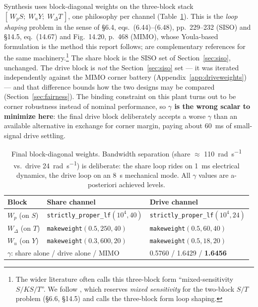 \documentclass[energies,article,submit,pdftex,oneauthor]{Definitions/mdpi}
\begin{document}
Synthesis uses block-diagonal weights on the three-block stack
$[\,W_p S;\; W_u Y;\; W_{\Delta} T\,]$, one philosophy per channel
(Table~\ref{tab:mimo-weights}). This is the \emph{loop shaping} problem in the sense of
\citep{assadian2020neoclassical} \S6.4, eqs.~(6.44)--(6.48), pp.~229--232 (SISO) and \S14.5,
eq.~(14.67) and Fig.~14.20, p.~468 (MIMO), whose Youla-based formulation is the method this
report follows; \citep{zhou1996robust,skogestad2005multivariable} are complementary
references for the same machinery.\footnote{The wider literature often calls this three-block
form ``mixed-sensitivity $S/KS/T$''. We follow \citep{assadian2020neoclassical}, which reserves
\emph{mixed sensitivity} for the two-block $S/T$ problem (\S6.6, \S14.5) and calls the
three-block form loop shaping.} The share block is the SISO set of Section~\ref{sec:siso},
unchanged. The drive block is \emph{not} the Section~\ref{sec:siso} set --- it was iterated
independently against the MIMO corner battery (Appendix~\ref{app:driveweights}) --- and that
difference bounds how the two designs may be compared (Section~\ref{sec:fairness}). The binding
constraint on this plant turns out to be corner robustness instead of nominal performance, so
\textbf{$\gamma$ is the wrong scalar to minimize here}: the final drive block deliberately accepts
a worse $\gamma$ than an available alternative in exchange for corner margin, paying about
\SI{60}{\milli\second} of small-signal drive settling.

\begin{table}[H]
\caption{Final block-diagonal weights. Bandwidth separation (share $\approx$
\SI{110}{\radian\per\second} vs.\ drive \SI{24}{\radian\per\second}) is deliberate: the share
loop rides on \SI{1}{\milli\second} electrical dynamics, the drive loop on an \SI{8}{\second}
mechanical mode. All $\gamma$ values are a-posteriori achieved levels.}
\label{tab:mimo-weights}
\begin{tabularx}{\textwidth}{lXX}
\toprule
\textbf{Block} & \textbf{Share channel} & \textbf{Drive channel} \\
\midrule
$W_p$ (on $S$) & \texttt{strictly\_proper\_lf}$(10^4, 40)$ & \texttt{strictly\_proper\_lf}$(10^4, 24)$ \\
$W_{\Delta}$ (on $T$) & \texttt{makeweight}$(0.5, 250, 40)$ & \texttt{makeweight}$(0.5, 60, 40)$ \\
$W_u$ (on $Y$) & \texttt{makeweight}$(0.3, 600, 20)$ & \texttt{makeweight}$(0.5, 18, 20)$ \\
\midrule
\multicolumn{2}{l}{$\gamma$: share alone / drive alone / MIMO} & 0.5760 / 1.6429 / \textbf{1.6456} \\
\bottomrule
\end{tabularx}
\end{table}
\end{document}

